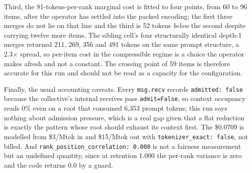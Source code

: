 \documentclass[11pt]{article}
\begin{document}
Third, the 81-tokens-per-rank marginal cost is fitted to four points, from 60 to 96 items,
after the operator has settled into the packed encoding; the first three merges do not lie
on that line and the third is 52 tokens \emph{below} the second despite carrying twelve
more items. The sibling cell's four structurally identical depth-1 merges returned 211, 269,
356 and 491 tokens on the same prompt structure, a 2.3$\times$ spread, so per-item cost in
the compressible regime is a choice the operator makes afresh and not a constant. The
crossing point of 59 items is therefore accurate for this run and should not be read as a
capacity for the configuration.

Finally, the usual accounting caveats. Every \texttt{msg.recv} records \texttt{admitted:
false} because the collective's internal receives pass \texttt{admit=False}, so context
occupancy reads 0\% even on a root that consumed 6{,}353 prompt tokens; this run says
nothing about admission pressure, which is a real gap given that a flat reduction is
exactly the pattern whose root should exhaust its context first. The \$0.0709 is modelled
from \$3/Mtok in and \$15/Mtok out with \texttt{tokenizer\_exact: false}, not billed. And
\texttt{rank\_position\_correlation: 0.000} is not a fairness measurement but an undefined
quantity, since at retention 1.000 the per-rank variance is zero and the code returns 0.0
by a guard.
\end{document}
